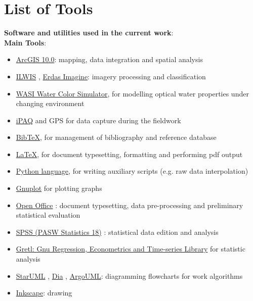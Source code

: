\documentclass[10pt, a4paper]{article}
\begin{document}
\pagebreak
\singlespace
\section*{List of Tools}\label{sec:0}

	\vspace{2em}

	\textbf{Software and utilities used in the current work}:\\
	
	\vspace{1ex}
	\textbf{Main Tools}:
	\begin{itemize}
		\item \href{http://www.esri.com/software/arcgis/index.html}{ArcGIS 10.0}: mapping, data integration and spatial analysis
		\item \href{http://www.ilwis.org/}{ILWIS} , \href{http://www.erdas.com/products/ERDASIMAGINE/ERDASIMAGINE/Details.aspx}{Erdas Imagine}: imagery processing and classification
		\item \href{http://www.filewatcher.com/b/ftp/ftp.dfd.dlr.de/pub/WASI.0.0.html}{WASI Water Color Simulator}, for modelling optical water 					properties under changing environment
		\item \href{http://welcome.hp.com/country/us/en/prodserv/handheld.html}{iPAQ} and GPS for data capture during the fieldwork
		\item \href{http://www.bibtex.org/de/}{BibTeX}, for management of bibliography and reference database
		\item \href{http://www.latex-project.org/}{\LaTeX}, for document typesetting, formatting and performing pdf output
		\item \href{http://www.python.org/}{Python language}, for writing auxiliary scripts (e.g. raw data interpolation)
		\item \href{http://www.gnuplot.info/}{Gnuplot} for plotting graphs
		\item \href{http://www.openoffice.org/}{Open Office} : document typesetting, data pre-processing and preliminary statistical evaluation
		
		\item \href{http://www.spss.com/}{SPSS (PASW Statistics 18)} : statistical data edition and analysis 
		\item \href{http://gretl.sourceforge.net/}{Gretl: Gnu Regression, Econometrics and Time-series Library} for statistic analysis
		\item \href{http://staruml.sourceforge.net/en/}{StarUML} , \href{http://live.gnome.org/Dia}{Dia} , \href{http://argouml.tigris.org/}						{ArgoUML}: diagramming flowcharts for work algorithms
		\item \href{http://inkscape.org/}{Inkscape}: drawing
	\end{itemize}
	
\end{document}
